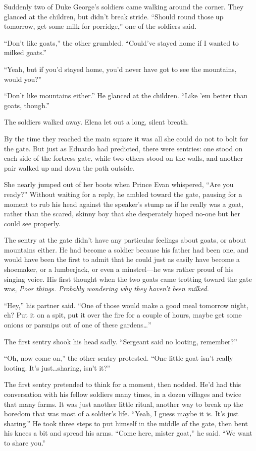 \documentclass[10pt]{book}
\begin{document}
Suddenly two of Duke George's soldiers came walking around the corner.  They glanced at the children, but didn't break stride. ``Should round those up tomorrow, get some milk for porridge,'' one of the soldiers said.

``Don't like goats,'' the other grumbled. ``Could've stayed home if I wanted to milked goats.''

``Yeah, but if you'd stayed home, you'd never have got to see the mountains, would you?''

``Don't like mountains either.'' He glanced at the children. ``Like 'em better than goats, though.''

The soldiers walked away. Elena let out a long, silent breath.

By the time they reached the main square it was all she could do not to bolt for the gate.  But just as Eduardo had predicted, there were sentries: one stood on each side of the fortress gate, while two others stood on the walls, and another pair walked up and down the path outside.

She nearly jumped out of her boots when Prince Evan whispered, ``Are you ready?''  Without waiting for a reply, he ambled toward the gate, pausing for a moment to rub his head against the speaker's stump as if he really was a goat, rather than the scared, skinny boy that she desperately hoped no-one but her could see properly.

The sentry at the gate didn't have any particular feelings about goats, or about mountains either. He had become a soldier because his father had been one, and would have been the first to admit that he could just as easily have become a shoemaker, or a lumberjack, or even a minstrel---he was rather proud of his singing voice. His first thought when the two goats came trotting toward the gate was, \emph{Poor things. Probably wondering why they haven't been milked.}

``Hey,'' his partner said. ``One of those would make a good meal tomorrow night, eh? Put it on a spit, put it over the fire for a couple of hours, maybe get some onions or parsnips out of one of these gardens{\ldots}''

The first sentry shook his head sadly. ``Sergeant said no looting, remember?''

``Oh, now come on,'' the other sentry protested. ``One little goat isn't really looting. It's just{\ldots}sharing, isn't it?''

The first sentry pretended to think for a moment, then nodded. He'd had this conversation with his fellow soldiers many times, in a dozen villages and twice that many farms. It was just another little ritual, another way to break up the boredom that was most of a soldier's life. ``Yeah, I guess maybe it is. It's just sharing.'' He took three steps to put himself in the middle of the gate, then bent his knees a bit and spread his arms. ``Come here, mister goat,'' he said. ``We want to share you.''
\end{document}

